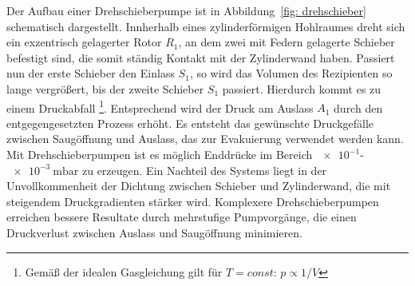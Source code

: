 Der Aufbau einer Drehschieberpumpe ist in Abbildung~\ref{fig: drehschieber} schematisch dargestellt. Innherhalb
eines zylinderförmigen Hohlraumes dreht sich ein exzentrisch gelagerter Rotor $R_1$, an dem zwei mit Federn gelagerte
Schieber befestigt sind, die somit ständig Kontakt mit der Zylinderwand haben. Passiert nun der erste Schieber den
Einlass $S_1$, so wird das Volumen des Rezipienten so lange vergrößert, bis der zweite Schieber $S_1$ passiert.
Hierdurch kommt es zu einem Druckabfall \footnote{Gemäß der idealen Gasgleichung gilt für $T=const$: $p\propto 1/V$}.
Entsprechend wird der Druck am Auslass $A_1$ durch den entgegengesetzten Prozess erhöht.
Es entsteht das gewünschte
Druckgefälle zwischen Saugöffnung und Auslass, das zur Evakuierung verwendet werden kann. Mit Drehschieberpumpen
ist es möglich Enddrücke im Bereich $\num{e-1}$-$\SI{e-3}{\milli\bar}$ zu erzeugen. Ein Nachteil des
Systems liegt in der Unvollkommenheit der Dichtung zwischen Schieber und Zylinderwand, die mit steigendem
Druckgradienten stärker wird. Komplexere Drehschieberpumpen
erreichen bessere Resultate durch mehrstufige Pumpvorgänge, die einen Druckverlust
zwischen Auslass und Saugöffnung minimieren.

